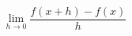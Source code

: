 \documentclass[preview]{standalone}
\begin{document}
\begin{center}
\[ \lim_{h\to 0} \frac{f(x + h) - f(x)}{h} \]
\end{center}
\end{document}
